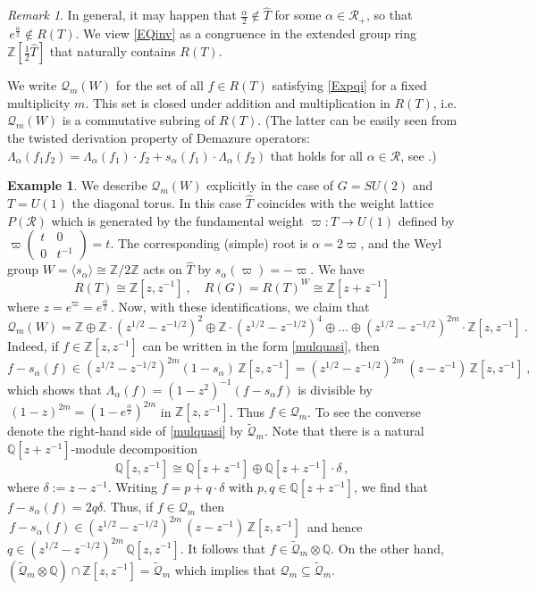 \documentclass[11pt]{amsart}
\theoremstyle{definition}
\newtheorem{example}[theorem]{Example}
\theoremstyle{remark}
\newtheorem{remark}[theorem]{Remark}
\numberwithin{equation}{section}
\newcommand{\la}{\label}
\def\cQ{\mathcal{Q}}
\def\Z{\mathbb{Z}}
\def\Q{\mathbb{Q}}
\def\R{\mathcal{R}}
\begin{document}
%
\begin{remark}
\la{R22}
In general, it may happen that $ \frac{\alpha}{2} \not\in \hat{T} $ for some $ \alpha \in \R_+ $, so that 
$\, e^{\frac{\alpha}{2}} \not\in R(T) $. We view
\eqref{EQinv} as a congruence in the extended group ring $ \Z[\frac{1}{2} \hat{T}] $ that naturally contains $ R(T) $.
\end{remark}
%
We write  $\cQ_m(W)$ for the set of all  $ f \in R(T) $ satisfying \eqref{Expqi} for a fixed multiplicity $ m $. This 
set is closed under addition and multiplication in $R(T)$, i.e. $\cQ_m(W)$ is a commutative subring of $ R(T) $. 
(The latter can be easily seen from the twisted derivation property of
Demazure operators: $ \Lambda_{\alpha}(f_1 f_2) = \Lambda_\alpha(f_1)\cdot f_2 + s_{\alpha}(f_1) \cdot \Lambda_{\alpha}(f_2) $ that holds for all $  \alpha \in \R $, see \cite[Sect. 5.5]{D74}.) 
%
\begin{example}
\la{ExSU2}
We describe $\cQ_m(W)$ explicitly in the case of $ G = SU(2) $ and $ T = U(1) $ the diagonal torus. In this case 
$ \hat{T} $ coincides with the weight lattice $P(\R)$  which is generated by the fundamental weight $ \varpi: T \to U(1) $ defined by $ \varpi \left(\begin{array}{cc} t & 0\\ 0 & t^{-1}\end{array}\right) = t $. The corresponding (simple) root is $ \alpha = 2 \varpi $, and the Weyl group $W = \langle s_{\alpha}\rangle \cong \Z/2\Z$ acts on $ \hat{T} $ by $ s_{\alpha}(\varpi) = - \varpi $. We have
%
\begin{equation}
\la{RTG}
R(T) \cong \Z[z, z^{-1}]\ ,\quad R(G) = R(T)^W \cong \Z[z+z^{-1}]
\end{equation}
%
where $ z = e^{\varpi} = e^{\frac{\alpha}{2}}\,$. Now, with these identifications, we claim that
%
\begin{equation}
\la{mulquasi}
\cQ_m(W) = \Z \oplus \Z \cdot (z^{1/2}-z^{-1/2})^2 \oplus \Z \cdot (z^{1/2}-z^{-1/2})^{4} \oplus \ldots \oplus (z^{1/2}-z^{-1/2})^{2m} \cdot \Z[z,z^{-1}]\ .   
\end{equation}
%
Indeed, if $ f \in \Z[z,z^{-1}] $ can be written in the form \eqref{mulquasi}, then 
$$ 
f - s_\alpha(f) \in  (z^{1/2}-z^{-1/2})^{2m} (1-s_\alpha)\,\Z[z,z^{-1}] = (z^{1/2}-z^{-1/2})^{2m} \,(z-z^{-1})\, \Z[z,z^{-1}]\ ,
$$
%
which shows that $ \Lambda_{\alpha}(f) = (1-z^2)^{-1}(f - s_\alpha f) $ is divisible by $\,(1-z)^{2m} = (1 - e^{\frac{\alpha}{2}})^{2m} $ in $ \Z[z,z^{-1}] $. Thus $ f \in \cQ_m $. 
To see the converse denote the right-hand side of \eqref{mulquasi} by $ \tilde{\cQ}_m$. Note that there is a natural  $\Q[z+z^{-1}]$-module decomposition
%
$$
\Q[z,z^{-1}] \cong \Q[z+z^{-1}] \oplus \Q[z+z^{-1}]\cdot \delta\,,
$$
%
where $\delta := z-z^{-1}$.  Writing $f = p + q \cdot \delta$ with $p, q \in \Q[z+z^{-1}]$, we find that $f-s_\alpha(f) = 2q \delta$. Thus, if  $ f \in \cQ_m $ then $\,f - s_\alpha(f) \in (z^{1/2}-z^{-1/2})^{2m}\,(z-z^{-1})\,\Z[z,z^{-1}]\,$ and hence $q \in (z^{1/2}-z^{-1/2})^{2m}\,\Q[z,z^{-1}]$. It follows that $ f \in \tilde{\cQ}_m \otimes \Q $.  On the other hand, $ (\tilde{\cQ}_m \otimes \Q) \cap \Z[z, z^{-1}] = \tilde{\cQ}_m$ which implies that $ \cQ_m \subseteq \tilde{\cQ}_m$. 
\end{example}
%
\end{document}
